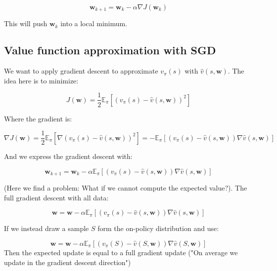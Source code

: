 	\begin{equation}
	 	\textbf{w}_{k+1} = \textbf{w}_k - \alpha \nabla J(\textbf{w}_k)
	 \end{equation} 

This will push $\textbf{w}_k$ into a local minimum. 

\subsection{Value function approximation with SGD}
We want to apply gradient descent to approximate $v_\pi(s)$ with $\hat{v}(s,\textbf{w})$. The idea here is to minimize:

	\begin{equation}
		J(\textbf{w}) = \frac{1} {2} \mathbb{E}_\pi[(v_\pi(s) - \hat{v}(s,\textbf{w}))^{2}]
	\end{equation}

Where the gradient is:

	\begin{equation}
		\nabla J(\textbf{w}) = \frac{1} {2} \mathbb{E}_\pi[\nabla (v_\pi(s) - \hat{v}(s,\textbf{w}))^{2}]= - \mathbb{E}_\pi [(v_\pi(s) - \hat{v}(s, \textbf{w}))\nabla \hat{v}(s,\textbf{w})]
	\end{equation}

And we express the gradient descent with:

	\begin{equation}
		\textbf{w}_{k+1} = \textbf{w}_k - \alpha \mathbb{E}_\pi [(v_\pi(s) - \hat{v}(s, \textbf{w}))\nabla \hat{v}(s,\textbf{w})]
	\end{equation}

(Here we find a problem: What if we cannot compute the expected value?). The full gradient descent with all data:

	\begin{equation}
		\textbf{w} = \textbf{w} - \alpha \mathbb{E}_\pi [(v_\pi(s) - \hat{v}(s, \textbf{w}))\nabla \hat{v}(s,\textbf{w})]
	\end{equation}

If we instead draw a sample $S$ form the on-policy distribution and use:

	\begin{equation}
		\textbf{w} = \textbf{w} - \alpha \mathbb{E}_\pi [(v_\pi(S) - \hat{v}(S, \textbf{w}))\nabla \hat{v}(S,\textbf{w})]
	\end{equation}
Then the expected update is equal to a full gradient update ("On average we update in the gradient descent direction")

